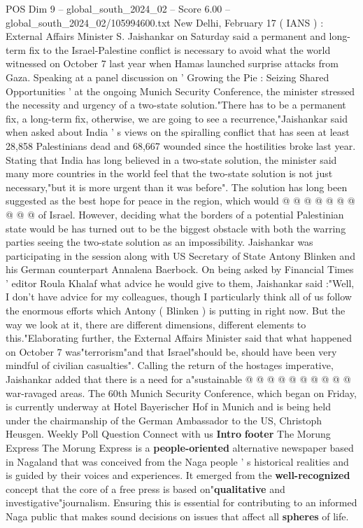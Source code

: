 \begin{textsample}{POS Dim 9 – global\_south\_2024\_02 – Score 6.00 – global\_south\_2024\_02/105994600.txt}  \label{ex:f9_pos_093}
New Delhi, February 17 ( IANS ) : External Affairs Minister S.
Jaishankar on Saturday said a permanent and long-term fix to the Israel-Palestine conflict is necessary to avoid what the world witnessed on October 7 last year when Hamas launched surprise attacks from Gaza.
Speaking at a panel discussion on ' Growing the Pie : Seizing Shared Opportunities ' at the ongoing Munich Security Conference, the minister stressed the necessity and urgency of a two-state solution."There has to be a permanent fix, a long-term fix, otherwise, we are going to see a recurrence,"Jaishankar said when asked about India ' s views on the spiralling conflict that has seen at least 28,858 Palestinians dead and 68,667 wounded since the hostilities broke last year.
Stating that India has long believed in a two-state solution, the minister said many more countries in the world feel that the two-state solution is not just necessary,"but it is more urgent than it was before".
The solution has long been suggested as the best hope for peace in the region, which would @ @ @ @ @ @ @ @ @ @ of Israel.
However, deciding what the borders of a potential Palestinian state would be has turned out to be the biggest obstacle with both the warring parties seeing the two-state solution as an impossibility.
Jaishankar was participating in the session along with US Secretary of State Antony Blinken and his German counterpart Annalena Baerbock.
On being asked by Financial Times ' editor Roula Khalaf what advice he would give to them, Jaishankar said :"Well, I don't have advice for my colleagues, though I particularly think all of us follow the enormous efforts which Antony ( Blinken ) is putting in right now.
But the way we look at it, there are different dimensions, different elements to this."Elaborating further, the External Affairs Minister said that what happened on October 7 was"terrorism"and that Israel"should be, should have been very mindful of civilian casualties".
Calling the return of the hostages imperative, Jaishankar added that there is a need for a"sustainable @ @ @ @ @ @ @ @ @ @ war-ravaged areas.
The 60th Munich Security Conference, which began on Friday, is currently underway at Hotel Bayerischer Hof in Munich and is being held under the chairmanship of the German Ambassador to the US, Christoph Heusgen.
Weekly Poll Question Connect with us \textbf{Intro} \textbf{footer} The Morung Express The Morung Express is a \textbf{people-oriented} alternative newspaper based in Nagaland that was conceived from the Naga people ' s historical realities and is guided by their voices and experiences.
It emerged from the \textbf{well-recognized} concept that the core of a free press is based on"\textbf{qualitative} and investigative"journalism.
Ensuring this is essential for contributing to an informed Naga public that makes sound decisions on issues that affect all \textbf{spheres} of life.

\end{textsample}
